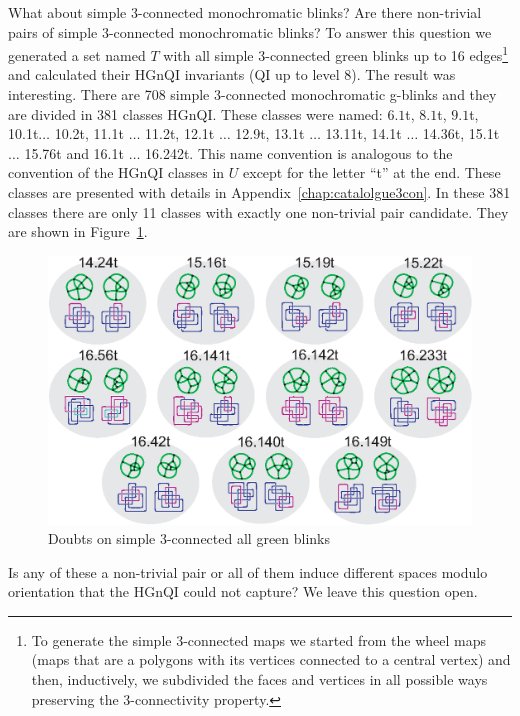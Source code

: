 What about simple 3-connected monochromatic blinks?  Are there
non-trivial pairs of simple 3-connected monochromatic blinks?
To answer this question we generated a set named $T$ with all simple
3-connected green blinks up to 16 edges\footnote{To generate the simple
3-connected maps we started from the wheel maps (maps that are a polygons
with its vertices connected to a central vertex) and then, inductively, we
subdivided the faces and vertices in all possible ways preserving the
3-connectivity property.}
and calculated their HGnQI invariants (QI up to level 8).
The result was interesting. There are
708 simple 3-connected monochromatic g-blinks and they are divided in 381
classes HGnQI. These classes were named: $6.1$t, $8.1$t, $9.1$t,
10.1t$\ldots$ 10.2t, 11.1t $\ldots$ 11.2t, 12.1t $\ldots$ 12.9t,
13.1t $\ldots$ 13.11t, 14.1t $\ldots$ 14.36t, 15.1t $\ldots$ 15.76t
and 16.1t $\ldots$ 16.242t. This name convention is analogous to
the convention of the HGnQI classes in $U$ except for the
letter ``t'' at the end. These classes are presented with details in
Appendix~\ref{chap:catalolgue3con}. In these 381 classes there are
only 11 classes with exactly one non-trivial pair candidate. They
are shown in Figure~\ref{fig:doubts3ConnectedIsolated}.

\enlargethispage{2cm}

\begin{figure}[htp]
   \begin{center}
      \leavevmode
      \includegraphics{fig/doubts3ConnectedIsolated.eps}
   \end{center}
   \vspace{-0.7cm}
   \caption{ Doubts on simple 3-connected all green blinks}
   \label{fig:doubts3ConnectedIsolated}
\end{figure}

Is any of these a non-trivial pair or all of them induce different spaces
modulo orientation that the HGnQI could not capture? We leave this question
open.
